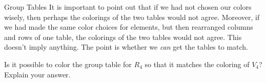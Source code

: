 \begin{section}{Group Tables}
It is important to point out that if we had not chosen our colors wisely, then perhaps the colorings of the two tables would not agree.  Moreover, if we had made the same color choices for elements, but then rearranged columns and rows of one table, the colorings of the two tables would not agree.  This doesn't imply anything.  The point is whether we \emph{can} get the tables to match.

\begin{problem}\label{prob:V4notR4coloring}
Is it possible to color the group table for $R_4$ so that it matches the coloring of $V_4$?  Explain your answer.
\end{problem}

\end{section}


